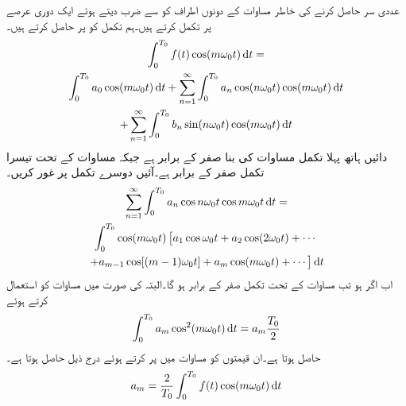 عددی سر  حاصل کرنے کی خاطر مساوات  کے دونوں اطراف کو  سے ضرب دیتے ہوئے ایک دوری عرصے پر تکمل کرتے ہیں۔ہم تکمل کو  پر حاصل کرتے ہیں۔
\begin{multline}\label{مساوات_فوریئر_عددی_سر_کا_حصول_الف}
\int_0^{T_0}f(t) \cos( m \omega_0 t) \dif t=\\
\int_0^{T_0} a_0 \cos (m\omega_0 t) \dif t+\sum_{n=1}^{\infty}  \int_0^{T_0} a_n\cos (n \omega_0 t)  \cos (m \omega_0 t) \dif t \\
+\sum_{n=1}^{\infty} \int_0^{T_0} b_n \sin (n \omega_0 t) \cos (m\omega_0 t) \dif t
\end{multline}
دائیں ہاتھ پہلا تکمل مساوات  کی بنا صفر کے برابر ہے جبکہ مساوات  کے تحت تیسرا تکمل صفر کے برابر ہے۔آئیں دوسرے تکمل پر غور کریں۔
\begin{multline*}
\sum_{n=1}^{\infty}  \int_0^{T_0} a_n\cos n \omega_0 t  \cos m \omega_0 t \dif t =\\
\int_0^{T_0} \cos (m\omega_0 t)\left[a_1 \cos \omega_0 t+a_2\cos (2\omega_0 t)+\cdots \right.\\
\left.+a_{m-1}\cos[(m-1)\omega_0 t]+a_m\cos(m\omega_0 t)+\cdots \right] \dif t
\end{multline*}
اب اگر  ہو تب مساوات  کے تحت تکمل صفر کے برابر ہو گا۔البتہ  کی صورت میں مساوات  کو استعمال کرتے ہوئے
\begin{align*}
\int_0^{T_0}a_m \cos^2 (m\omega_0 t) \dif t=a_m\frac{T_0}{2}
\end{align*} 
حاصل ہوتا ہے۔ان قیمتوں کو مساوات  میں پر کرتے ہوئے درج ذیل حاصل ہوتا ہے۔
\begin{align}\label{مساوات_فوریئر_عددی_سر_ب}
a_m=\frac{2}{T_0}\int_0^{T_0}f(t) \cos (m \omega_0 t) \dif t
\end{align}

